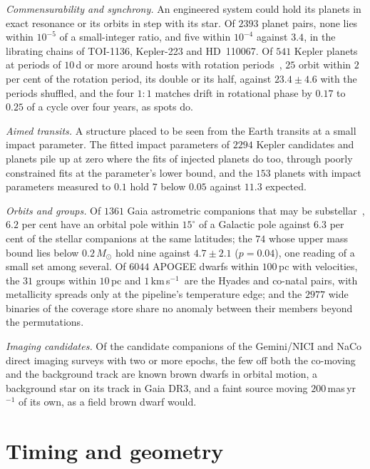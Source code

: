 \documentclass[3p,11pt]{elsarticle}
\newcommand{\kms}{km\,s$^{-1}$}
\begin{document}
\emph{Commensurability and synchrony.} An engineered system could hold its planets in
exact resonance or its orbits in step with its star. Of $2393$ planet pairs, none lies
within $10^{-5}$ of a small-integer ratio, and five within $10^{-4}$ against $3.4$, in the
librating chains of TOI-1136, Kepler-223 and HD~110067. Of $541$ Kepler planets at
periods of $10$\,d or more around hosts with rotation periods~\cite{McQuillan2013,Mazeh2015},
$25$ orbit within $2$ per cent of the rotation period, its double or its half, against
$23.4\pm4.6$ with the periods shuffled, and the four $1{:}1$ matches drift in rotational
phase by $0.17$ to $0.25$ of a cycle over four years, as spots do.

\emph{Aimed transits.} A structure placed to be seen from the Earth transits at a small
impact parameter. The fitted impact parameters of $2294$ Kepler candidates and planets
pile up at zero where the fits of injected planets do too, through poorly constrained
fits at the parameter's lower bound, and the $153$ planets with impact parameters
measured to $0.1$ hold $7$ below $0.05$ against $11.3$ expected.

\emph{Orbits and groups.} Of $1361$ Gaia astrometric companions that may be
substellar~\cite{Gaia2023nss}, $6.2$ per cent have an orbital pole within $15^\circ$ of a
Galactic pole against $6.3$ per cent of the stellar companions at the same latitudes;
the $74$ whose upper mass bound lies below $0.2\,M_\odot$ hold nine against $4.7\pm2.1$
($p=0.04$), one reading of a small set among several. Of
$6044$ APOGEE dwarfs within $100$\,pc with velocities, the $31$ groups within $10$\,pc and
$1$\,\kms\ are the Hyades and co-natal pairs, with metallicity spreads only at the
pipeline's temperature edge; and the $2977$ wide binaries of the coverage store share no
anomaly between their members beyond the permutations.

\emph{Imaging candidates.} Of the candidate companions of the Gemini/NICI and NaCo direct
imaging surveys with two or more epochs, the few off both the co-moving and the
background track are known brown dwarfs in orbital motion, a background star on its
track in Gaia DR3, and a faint source moving $200$\,mas\,yr$^{-1}$ of its own, as a field
brown dwarf would.

\section{Timing and geometry}\label{sec:timing}
\end{document}
